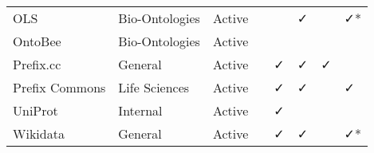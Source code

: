 \begin{table}
\begin{tabular}{llllllll}
            OLS &  Bio-Ontologies &       Active &                           &                        &                              ✓ &                             &                     ✓* \\
        OntoBee &  Bio-Ontologies &       Active &                           &                        &                                &                             &                        \\
      Prefix.cc &         General &       Active &                           &                      ✓ &                              ✓ &                           ✓ &                        \\
 Prefix Commons &   Life Sciences &       Active &                           &                      ✓ &                              ✓ &                             &                      ✓ \\
        UniProt &        Internal &       Active &                           &                      ✓ &                                &                             &                        \\
       Wikidata &         General &       Active &                           &                      ✓ &                              ✓ &                             &                     ✓* \\
\bottomrule
\end{tabular}
\end{table}
